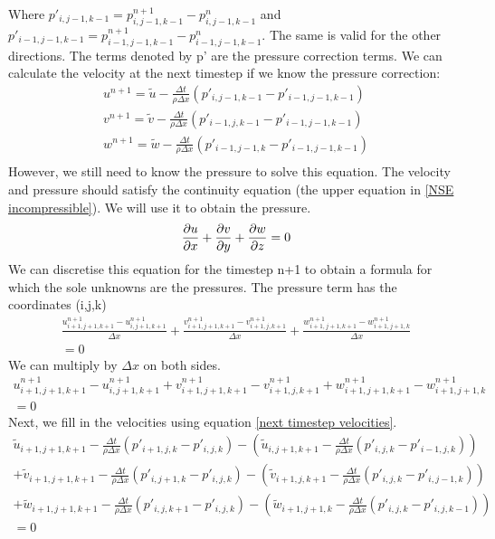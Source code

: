 \documentclass{article}
\begin{document}
	Where \(p'_{i,j-1,k-1}=p^{n+1}_{i,j-1,k-1}-p^{n}_{i,j-1,k-1}\) and \(p'_{i-1,j-1,k-1}=p^{n+1}_{i-1,j-1,k-1}-p^{n}_{i-1,j-1,k-1}\).  The same is valid for the other directions. The terms denoted by p' are the pressure correction terms. We can calculate the velocity at the next timestep if we know the pressure correction:
\begin{equation}
  \begin{split}
    u^{n+1}=\tilde{u}-\frac{\Delta t}{\rho \Delta x}(p'_{i,j-1,k-1} - p'_{i-1,j-1,k-1})\\
    v^{n+1}=\tilde{v}-\frac{\Delta t}{\rho \Delta x}(p'_{i-1,j,k-1} - p'_{i-1,j-1,k-1})\\
    w^{n+1}=\tilde{w}-\frac{\Delta t}{\rho \Delta x}(p'_{i-1,j-1,k}- p'_{i-1,j-1,k-1})\\
  \end{split} \label{next timestep velocities}
\end{equation}
However, we still need to know the pressure to solve this equation. The velocity and pressure should satisfy the continuity equation (the upper equation in \ref{NSE incompressible}). We will use it to obtain the pressure.\cite{MAC}
\[
  \pdv{u}{x}+\pdv{v}{y}+\pdv{w}{z}=0
\]
We can discretise this equation for the timestep n+1 to obtain a formula for which the sole unknowns are the pressures. The pressure term has the coordinates (i,j,k)
\begin{equation}
  \begin{split}
    \frac{u^{n+1}_{i+1,j+1,k+1}-u^{n+1}_{i, j+1, k+1}}{\Delta x} + 
    \frac{v^{n+1}_{i+1,j+1,k+1}-v^{n+1}_{i+1, j, k+1}}{\Delta x} + 
    \frac{w^{n+1}_{i+1,j+1,k+1}-w^{n+1}_{i+1, j+1, k}}{\Delta x}\\=0 
  \end{split} \label{continuity discretised}
\end{equation}
We can multiply by \(\Delta x\) on both sides.
\[
  \begin{split}
    u^{n+1}_{i+1,j+1,k+1}-u^{n+1}_{i, j+1, k+1} + 
    v^{n+1}_{i+1,j+1,k+1}-v^{n+1}_{i+1, j, k+1} + 
    w^{n+1}_{i+1,j+1,k+1}-w^{n+1}_{i+1, j+1, k}\\=0 
  \end{split}
\]
Next, we fill in the velocities using equation \ref{next timestep velocities}.
\[
  \begin{split}
    \tilde{u}_{i+1,j+1,k+1} - \frac{\Delta t}{\rho \Delta x}(p'_{i+1,j,k}-p'_{i,j,k})
    -\left(\tilde{u}_{i, j+1, k+1} - \frac{\Delta t}{\rho \Delta x}(p'_{i,j,k}-p'_{i-1,j,k})\right)\\
    +\tilde{v}_{i+1,j+1,k+1} - \frac{\Delta t}{\rho \Delta x}(p'_{i,j+1,k}-p'_{i,j,k})
    -\left(\tilde{v}_{i+1, j, k+1} - \frac{\Delta t}{\rho \Delta x}(p'_{i,j,k}-p'_{i,j-1,k})\right)\\
    +\tilde{w}_{i+1,j+1,k+1} - \frac{\Delta t}{\rho \Delta x}(p'_{i,j,k+1}-p'_{i,j,k})
    -\left(\tilde{w}_{i+1, j+1, k} - \frac{\Delta t}{\rho \Delta x}(p'_{i,j,k}-p'_{i,j,k-1})\right)\\
    =0
  \end{split}
\]
\end{document}
